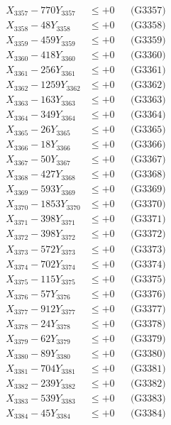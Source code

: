 \documentclass[a4paper,10pt]{article}
\begin{document}
{\begin{align}
X_{3357} - 770Y_{3357} &\leq +0 && \text{(G3357)} \\
X_{3358} - 48Y_{3358} &\leq +0 && \text{(G3358)} \\
X_{3359} - 459Y_{3359} &\leq +0 && \text{(G3359)} \\
X_{3360} - 418Y_{3360} &\leq +0 && \text{(G3360)} \\
\allowbreak
X_{3361} - 256Y_{3361} &\leq +0 && \text{(G3361)} \\
X_{3362} - 1259Y_{3362} &\leq +0 && \text{(G3362)} \\
X_{3363} - 163Y_{3363} &\leq +0 && \text{(G3363)} \\
X_{3364} - 349Y_{3364} &\leq +0 && \text{(G3364)} \\
X_{3365} - 26Y_{3365} &\leq +0 && \text{(G3365)} \\
X_{3366} - 18Y_{3366} &\leq +0 && \text{(G3366)} \\
X_{3367} - 50Y_{3367} &\leq +0 && \text{(G3367)} \\
X_{3368} - 427Y_{3368} &\leq +0 && \text{(G3368)} \\
X_{3369} - 593Y_{3369} &\leq +0 && \text{(G3369)} \\
X_{3370} - 1853Y_{3370} &\leq +0 && \text{(G3370)} \\
\allowbreak
X_{3371} - 398Y_{3371} &\leq +0 && \text{(G3371)} \\
X_{3372} - 398Y_{3372} &\leq +0 && \text{(G3372)} \\
X_{3373} - 572Y_{3373} &\leq +0 && \text{(G3373)} \\
X_{3374} - 702Y_{3374} &\leq +0 && \text{(G3374)} \\
X_{3375} - 115Y_{3375} &\leq +0 && \text{(G3375)} \\
X_{3376} - 57Y_{3376} &\leq +0 && \text{(G3376)} \\
X_{3377} - 912Y_{3377} &\leq +0 && \text{(G3377)} \\
X_{3378} - 24Y_{3378} &\leq +0 && \text{(G3378)} \\
X_{3379} - 62Y_{3379} &\leq +0 && \text{(G3379)} \\
X_{3380} - 89Y_{3380} &\leq +0 && \text{(G3380)} \\
\allowbreak
X_{3381} - 704Y_{3381} &\leq +0 && \text{(G3381)} \\
X_{3382} - 239Y_{3382} &\leq +0 && \text{(G3382)} \\
X_{3383} - 539Y_{3383} &\leq +0 && \text{(G3383)} \\
X_{3384} - 45Y_{3384} &\leq +0 && \text{(G3384)} \\

\end{align}}
\end{document}
